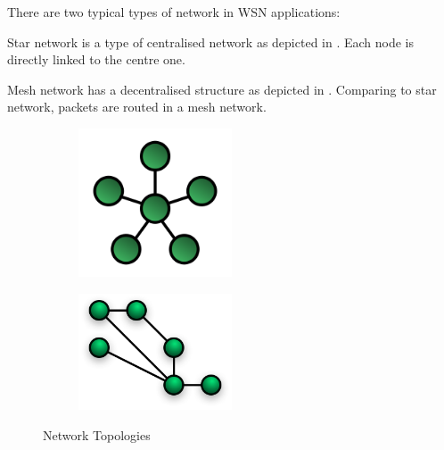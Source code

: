 There are two typical types of network in WSN applications:
\begin{description}[style=nextline]
	\item[\textbf{Star Network}]
	Star network is a type of centralised network as depicted in . Each node is directly linked to the centre one. 
	\item[\textbf{Mesh Network}]
	Mesh network has a decentralised structure as depicted in . Comparing to star network, packets are routed in a mesh network.
\end{description}
\begin{figure}
	\centering
	\begin{subfigure}[b]{0.5\textwidth}
		{
			\includegraphics[width=0.5\textwidth,]{fig/StarNetwork.png}
		}
		 \label{fig: Star Network}
	\end{subfigure}
	\begin{subfigure}[b]{0.5\textwidth}
		{
			\includegraphics[width=0.5\textwidth,]{fig/NetworkTopology-Mesh.png}
		}
		 \label{fig: Mesh Network}
	\end{subfigure}
	\caption{Network Topologies} \label{fig: Network topologies}
\end{figure}

%

